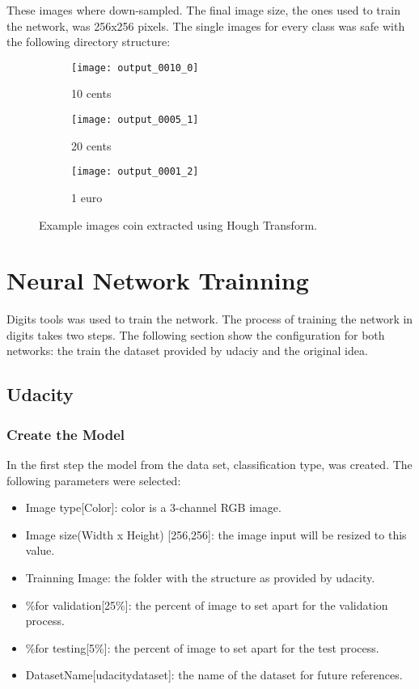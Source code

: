 \documentclass[10pt,journal,compsoc]{IEEEtran}
\begin{document}
These images where down-sampled. The final image size, the ones used to train the network, was 256x256 pixels. The single images for every class was safe with the following directory structure:


\begin{figure}[h]
\centering
\begin{subfigure}[b]{0.15\textwidth}
\texttt{[image: output\_0010\_0]}
\caption{10 cents}
\end{subfigure}
\begin{subfigure}[b]{0.15\textwidth}
\texttt{[image: output\_0005\_1]}
\caption{20 cents}
\end{subfigure}
\begin{subfigure}[b]{0.15\textwidth}
\texttt{[image: output\_0001\_2]}
\caption{1 euro}
\end{subfigure}
\label{fig:figure2}
\caption{Example images coin extracted using Hough Transform.}
\end{figure}


\section{Neural Network Trainning}

Digits tools was used to train the network. The process of training the network in digits takes two steps. The following section show the configuration for both networks: the train the dataset provided by udaciy and the original idea.

\subsection{Udacity}
\subsubsection{Create the Model}

In the first step the model from the data set, classification type, was created. The following parameters were selected:

\begin{itemize}
\item Image type[Color]: color is a  3-channel RGB image.
\item Image size(Width x Height) [256,256]: the image input will be resized to this value. 
\item Trainning Image: the folder with the structure as provided by udacity.
\item \%for validation[25\%]: the percent of image to set apart for the validation process.
\item \%for testing[5\%]: the percent of image to set apart for the test process.
\item DatasetName[udacity\-dataset]: the name of the dataset for future references.
\end{itemize}
\end{document}

